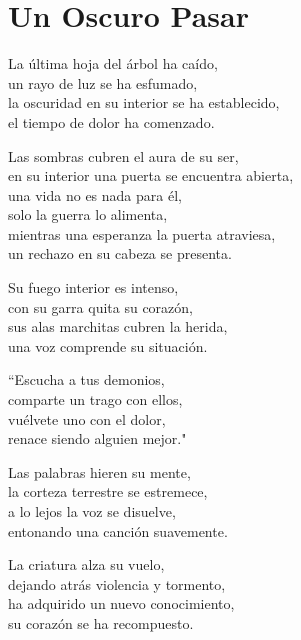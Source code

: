 \section*{Un Oscuro Pasar}
\label{Oscuro_pasar}

\vspace{1em}
\begin{center}
La última hoja del árbol ha caído,\\ 
un rayo de luz se ha esfumado,\\ 
la oscuridad en su interior se ha establecido,\\ 
el tiempo de dolor ha comenzado.

\vspace{1em} 
Las sombras cubren el aura de su ser,\\ 
en su interior una puerta se encuentra abierta,\\ 
una vida no es nada para él,\\ 
solo la guerra lo alimenta,\\ 
mientras una esperanza la puerta atraviesa,\\ 
un rechazo en su cabeza se presenta.

\vspace{1em} 
Su fuego interior es intenso,\\ 
con su garra quita su corazón,\\ 
sus alas marchitas cubren la herida,\\ 
una voz comprende su situación.

\vspace{1em} 
``Escucha a tus demonios,\\ 
comparte un trago con ellos,\\ 
vuélvete uno con el dolor,\\ 
renace siendo alguien mejor."

\vspace{1em} 
Las palabras hieren su mente,\\ 
la corteza terrestre se estremece,\\ 
a lo lejos la voz se disuelve,\\ 
entonando una canción suavemente.

\vspace{1em} 
La criatura alza su vuelo,\\ 
dejando atrás violencia y tormento,\\ 
ha adquirido un nuevo conocimiento,\\ 
su corazón se ha recompuesto.


\end{center}
